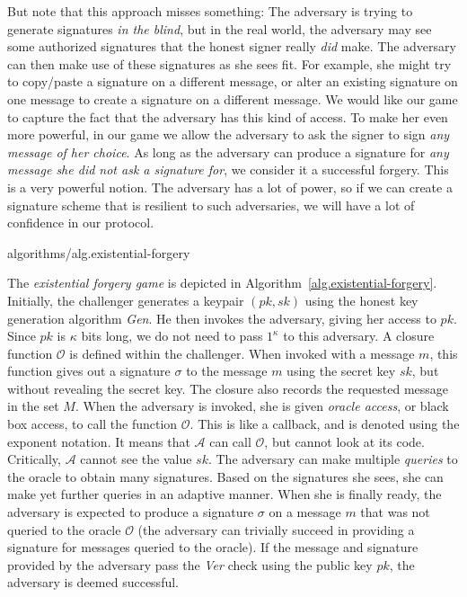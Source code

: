 But note that this approach misses something: The adversary is trying to generate
signatures \emph{in the blind}, but in the real world, the adversary may see some
authorized signatures that the honest signer really \emph{did} make. The adversary
can then make use of these signatures as she sees fit. For example, she might try
to copy/paste a signature on a different message, or alter an existing signature
on one message to create a signature on a different message. We would like our
game to capture the fact that the adversary has this kind of access. To make her
even more powerful, in our game we allow the adversary to ask the signer to sign
\emph{any message of her choice}. As long as the adversary can produce a signature
for \emph{any message she did not ask a signature for}, we consider it a successful
forgery. This is a very powerful notion. The adversary has a lot of power, so if
we can create a signature scheme that is resilient to such adversaries, we will have
a lot of confidence in our protocol.

{algorithms/alg.existential-forgery}

The \emph{existential forgery game} is depicted in Algorithm~\ref{alg.existential-forgery}.
Initially, the challenger generates a keypair $(pk, sk)$ using the honest key generation
algorithm \emph{Gen}. He then invokes the adversary, giving her access to $pk$. Since
$pk$ is $\kappa$ bits long, we do not need to pass $1^\kappa$ to this adversary.
A closure function $\mathcal{O}$ is defined within the challenger. When invoked
with a message $m$, this function gives out a signature $\sigma$ to the message
$m$ using the secret key $sk$, but without revealing the secret key. The closure
also records the requested message in the set $M$.
When the adversary is invoked, she is given \emph{oracle access}, or black box access,
to call the function $\mathcal{O}$. This is like a callback, and is denoted using the
exponent notation. It means that $\mathcal{A}$ can call $\mathcal{O}$, but
cannot look at its code. Critically, $\mathcal{A}$ cannot see the value $sk$.
The adversary can make multiple \emph{queries} to the oracle to obtain many
signatures. Based on the signatures she sees, she can make yet further queries
in an adaptive manner. When she is finally ready, the adversary is expected
to produce a signature $\sigma$ on a message $m$ that was not queried to the
oracle $\mathcal{O}$ (the adversary can trivially succeed in providing a signature
for messages queried to the oracle). If the message and signature provided by
the adversary pass the \emph{Ver} check using the public key $pk$, the adversary
is deemed successful.

